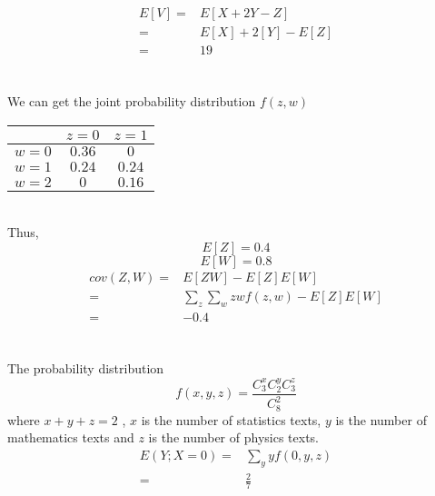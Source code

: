 \documentclass{article}
\begin{document}
        \begin{equation*}
            \begin{split}
                E[V]=&E[X+2Y-Z]\\
                    =&E[X]+2[Y]-E[Z]\\
                    =&19
            \end{split}
        \end{equation*}
    
    \section{}
    We can get the joint probability distribution $f(z,w)$
    \textbf{ }\\

    \begin{tabular}{|c|c|c|}
        \hline        & $z=0$ & $z=1$ \\
        \hline  $w=0$ & $0.36$ & $0$\\
        \hline  $w=1$ & $0.24$ & $0.24$  \\
        \hline  $w=2$ & $0$ & $0.16$ \\
        \hline
    \end{tabular} 

    \textit{ }\\
    Thus, $$E[Z]=0.4$$
    $$E[W]=0.8$$
    \begin{equation*}
        \begin{split}
            cov(Z,W)=&E[ZW]-E[Z]E[W]\\
                =&\sum _z \sum _w zwf(z,w)-E[Z]E[W]\\
                =&-0.4
        \end{split}
    \end{equation*}

    \section{}
    The probability distribution $$f(x,y,z)=\frac{C_3 ^x C_2 ^y C _3 ^z}{C_8 ^2}$$
    where $x+y+z=2$ , $x$ is the number of statistics texts, $y$ is the number of mathematics texts and $z$ is the number of physics texts.
        \begin{equation*}
            \begin{split}
                E(Y;X=0)=&\sum _y yf(0,y,z)\\
                    =&\frac{2}{7}
            \end{split}
        \end{equation*}
\end{document}
